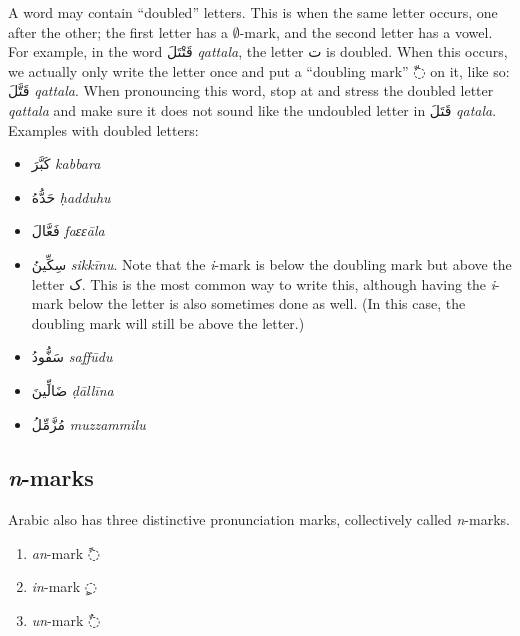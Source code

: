 \documentclass[
  10pt,
]{book}
\providecommand{\tightlist}{%
  \setlength{\itemsep}{0pt}\setlength{\parskip}{0pt}}
\begin{document}
A word may contain \enquote{doubled} letters. This is when the same letter occurs, one after the other; the first letter has a \(\emptyset\)-mark, and the second letter has a vowel. For example, in the word \foreignlanguage{arabic}{قَتْتَلَ} \emph{qattala}, the letter \foreignlanguage{arabic}{ت} is doubled. When this occurs, we actually only write the letter once and put a \enquote{doubling mark} \foreignlanguage{arabic}{◌ّ} on it, like so: \foreignlanguage{arabic}{قَتَّلَ} \emph{qattala}. When pronouncing this word, stop at and stress the doubled letter \emph{qattala} and make sure it does not sound like the undoubled letter in \foreignlanguage{arabic}{قَتَلَ} \emph{qatala}. Examples with doubled letters:

\begin{itemize}
\tightlist
\item
  \foreignlanguage{arabic}{کَبَّرَ} \emph{kabbara}
\item
  \foreignlanguage{arabic}{حَدُّهُ} \emph{ḥadduhu}
\item
  \foreignlanguage{arabic}{فَعَّالَ} \emph{faɛɛāla}
\item
  \foreignlanguage{arabic}{سِکِّينُ} \emph{sikkīnu}. Note that the \emph{i}-mark is below the doubling mark but above the letter \foreignlanguage{arabic}{ک}. This is the most common way to write this, although having the \emph{i}-mark below the letter is also sometimes done as well. (In this case, the doubling mark will still be above the letter.)
\item
  \foreignlanguage{arabic}{سَفُّودُ} \emph{saffūdu}
\item
  \foreignlanguage{arabic}{ضَالِّينَ} \emph{ḍāllīna}
\item
  \foreignlanguage{arabic}{مُزَّمِّلُ} \emph{muzzammilu}
\end{itemize}

\subsection{\texorpdfstring{\emph{n}-marks}{n-marks}}\label{n-marks}

Arabic also has three distinctive pronunciation marks, collectively called \emph{n}-marks.

\begin{enumerate}
\def\labelenumi{\arabic{enumi}.}
\tightlist
\item
  \emph{an}-mark \foreignlanguage{arabic}{◌ً}
\item
  \emph{in}-mark \foreignlanguage{arabic}{◌ٍ}
\item
  \emph{un}-mark \foreignlanguage{arabic}{◌ٌ}
\end{enumerate}
\end{document}

